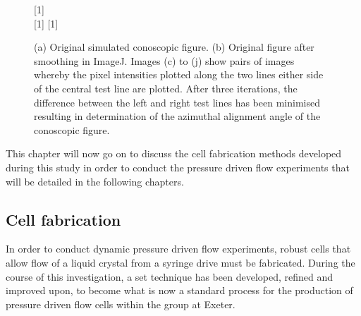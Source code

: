 \begin{figure}
\begin{center}
\scalebox{0.9}[1]{}\\
\scalebox{0.9}[1]{}
\scalebox{0.9}[1]{}
\end{center}
\caption[Automated conoscopic figure tracking routine]{\label{fig:figure_rotation1}(a) Original simulated conoscopic figure. (b) Original figure after smoothing in ImageJ. Images (c) to (j) show pairs of images whereby the pixel intensities plotted along the two lines either side of the central test line are plotted. After three iterations, the difference between the left and right test lines has been minimised resulting in determination of the azimuthal alignment angle of the conoscopic figure.}
\end{figure}

This chapter will now go on to discuss the cell fabrication methods developed during this study in order to conduct the pressure driven flow experiments that will be detailed in the following chapters.

\subsection{Cell fabrication}
\label{sec:cell_fabrication}
In order to conduct dynamic pressure driven flow experiments, robust cells that allow flow of a liquid crystal from a syringe drive must be fabricated. During the course of this investigation, a set technique has been developed, refined and improved upon, to become what is now a standard process for the production of pressure driven flow cells within the group at Exeter.

